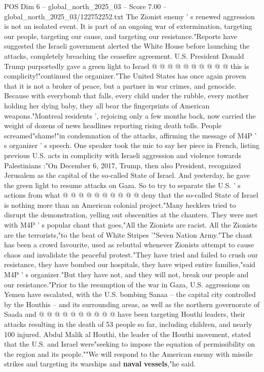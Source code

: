 \begin{textsample}{POS Dim 6 – global\_north\_2025\_03 – Score 7.00 – global\_north\_2025\_03/122752252.txt}
The Zionist enemy ' s renewed aggression is not an isolated event.
It is part of an ongoing war of extermination, targeting our people, targeting our cause, and targeting our resistance."Reports have suggested the Israeli government alerted the White House before launching the attacks, completely breaching the ceasefire agreement.
U.S.
President Donald Trump purportedly gave a green light to Israel @ @ @ @ @ @ @ @ @ @ this is complicity!"continued the organizer."The United States has once again proven that it is not a broker of peace, but a partner in war crimes, and genocide.
Because with everybomb that falls, every child under the rubble, every mother holding her dying baby, they all bear the fingerprints of American weapons."Montreal residents ', rejoicing only a few months back, now carried the weight of dozens of news headlines reporting rising death tolls.
People screamed"shame!"in condemnation of the attacks, affirming the message of M4P ' s organizer ' s speech.
One speaker took the mic to say her piece in French, listing previous U.S. acts in complicity with Israeli aggression and violence towards Palestinians :"On December 6, 2017, Trump, then also President, recognized Jerusalem as the capital of the so-called State of Israel.
And yesterday, he gave the green light to resume attacks on Gaza.
So to try to separate the U.S. ' s actions from what @ @ @ @ @ @ @ @ @ @ deny that the so-called State of Israel is nothing more than an American colonial project."Many hecklers tried to disrupt the demonstration, yelling out obscenities at the chanters.
They were met with M4P ' s popular chant that goes,"All the Zionists are racist.
All the Zionists are the terrorists,"to the beat of White Stripes '"Seven Nation Army."The chant has been a crowd favourite, used as rebuttal whenever Zionists attempt to cause chaos and invalidate the peaceful protest."They have tried and failed to crush our resistance, they have bombed our hospitals, they have wiped entire families,"said M4P ' s organizer."But they have not, and they will not, break our people and our resistance."Prior to the resumption of the war in Gaza, U.S. aggressions on Yemen have escalated, with the U.S. bombing Sanaa -- the capital city controlled by the Houthis -- and its surrounding areas, as well as the northern governorate of Saada and @ @ @ @ @ @ @ @ @ @ have been targeting Houthi leaders, their attacks resulting in the death of 53 people so far, including children, and nearly 100 injured.
Abdul Malik al Houthi, the leader of the Houthi movement, stated that the U.S. and Israel were"seeking to impose the equation of permissibility on the region and its people.""We will respond to the American enemy with missile strikes and targeting its warships and \textbf{naval} \textbf{vessels},"he said.

\end{textsample}
